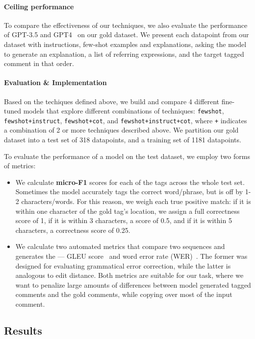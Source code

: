 \paragraph{Ceiling performance} To compare the effectiveness of our techniques, we also evaluate the performance of GPT-3.5 and GPT4~\citep{achiam2023gpt} on our gold dataset. We present each datapoint from our dataset with instructions, few-shot examples and explanations, asking the model to generate an explanation, a list of referring expressions, and the target tagged comment in that order.

\paragraph{Evaluation \& Implementation} Based on the techiques defined above, we build and compare 4 different fine-tuned models that explore different combinations of techniques: \texttt{fewshot}, \texttt{fewshot+instruct}, \texttt{fewshot+cot}, and \texttt{fewshot+instruct+cot}, where \texttt{+} indicates a combination of 2 or more techniques described above. We partition our gold dataset into a test set of 318 datapoints, and a training set of 1181 datapoints. 

To evaluate the performance of a model on the test dataset, we employ two forms of metrics:

\begin{itemize}
    \item We calculate \textbf{micro-F1} scores for each of the tags across the whole test set. Sometimes the model accurately tags the correct word/phrase, but is off by 1-2 characters/words. For this reason, we weigh each true positive match: if it is within one character of the gold tag's location, we assign a full correctness score of 1, if it is within 3 characters, a score of 0.5, and if it is within 5 characters, a correctness score of 0.25.
    \item We calculate two automated metrics that compare two sequences and generates the --- GLEU score~\citep{napoles-EtAl:2015:ACL-IJCNLP} and word error rate (WER)~\citep{woodard1982}. The former was designed for evaluating grammatical error correction, while the latter is analogous to edit distance. Both metrics are suitable for our task, where we want to penalize large amounts of differences between model generated tagged comments and the gold comments, while copying over most of the input comment.
\end{itemize}

\subsection{Results}

